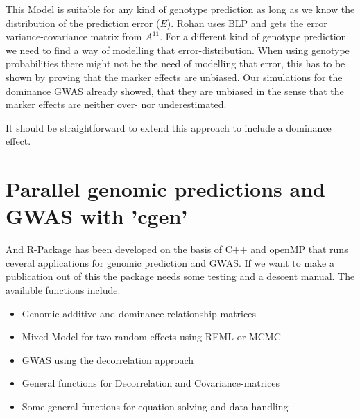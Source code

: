 \documentclass[a4paper,DIVcalc,12pt,liststotoc,bibtotoc,headsepline,plainheadsepline]{scrartcl}
\begin{document}
This Model is suitable for any kind of genotype prediction as long as we know the distribution of the prediction error ($E$). Rohan uses BLP and gets the error variance-covariance matrix from $A^{11}$.
For a different kind of genotype prediction we need to find a way of modelling that error-distribution. 
When using genotype probabilities there might not be the need of modelling that error, this has to be shown by proving that the marker effects are unbiased. Our simulations for the dominance GWAS already showed, that they are unbiased in the sense that the marker effects are neither over- nor underestimated.

It should be straightforward to extend this approach to include a dominance effect.


\section{Parallel genomic predictions and GWAS with 'cgen'}
And R-Package has been developed on the basis of C++ and openMP that runs ceveral applications for genomic prediction and GWAS. 
If we want to make a publication out of this the package needs some testing and a descent manual.
The available functions include:
\begin{itemize}
\item Genomic additive and dominance relationship matrices
\item Mixed Model for two random effects using REML or MCMC
\item GWAS using the decorrelation approach
\item General functions for Decorrelation and Covariance-matrices
\item Some general functions for equation solving and data handling
\end{itemize}
\end{document}
